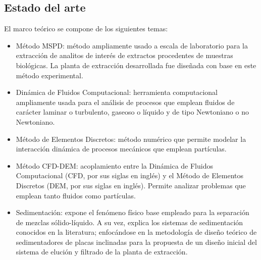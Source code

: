 \begin{center}
	\section{Estado del arte}
\end{center}

\noindent
\justify

El marco te\'orico se compone de los siguientes temas: 

\begin{itemize}
	\item M\'etodo MSPD: m\'etodo ampliamente usado a escala de laboratorio para la extracci\'on de analitos de inter\'es de extractos procedentes de muestras biol\'ogicas. La planta de extracci\'on desarrollada fue dise\~nada con base en este m\'etodo experimental.
	\item Din\'amica de Fluidos Computacional: herramienta computacional ampliamente usada para el an\'alisis de procesos que emplean fluidos de car\'acter laminar o turbulento, gaseoso o l\'iquido y de tipo Newtoniano o no Newtoniano.
	\item M\'etodo de Elementos Discretos: m\'etodo num\'erico que permite modelar la interacci\'on din\'amica de procesos mec\'anicos que emplean part\'iculas. 
	\item M\'etodo CFD-DEM: acoplamiento entre la Din\'amica de Fluidos Computacional (CFD, por sus siglas en ingl\'es) y el M\'etodo de Elementos Discretos (DEM, por sus siglas en ingl\'es). Permite analizar problemas que emplean tanto fluidos como part\'iculas.
	\item Sedimentaci\'on: expone el fen\'omeno f\'isico base empleado para la separaci\'on de mezclas s\'olido-l\'iquido. A su vez, explica los sistemas de sedimentaci\'on conocidos en la literatura; enfoc\'andose en la metodolog\'ia de dise\~no te\'orico de sedimentadores de placas inclinadas para la propuesta de un dise\~no inicial del sistema de eluci\'on y filtrado de la planta de extracci\'on.
\end{itemize}










